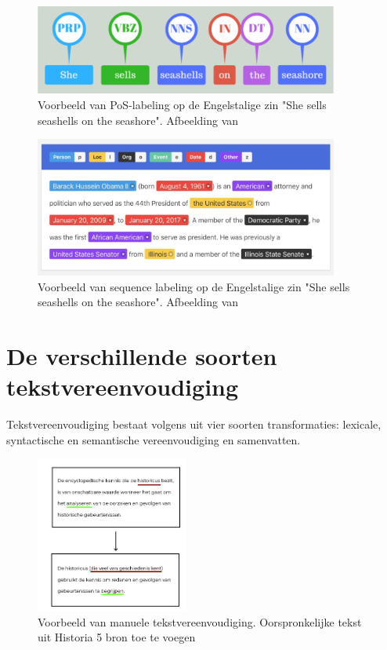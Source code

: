 \begin{figure}[H]
	\begin{center}
		\includegraphics[width=10cm]{img/poslabeling.png}
	\end{center}
	\caption{Voorbeeld van PoS-labeling op de Engelstalige zin "She sells seashells on the seashore". Afbeelding van \textcite{Bilisci2021} }
	\label{fig:pos}
\end{figure}

\begin{figure}[H]
	\begin{center}
		\includegraphics[width=10cm]{img/nerlabeling.jpg}
	\end{center}
	\caption{Voorbeeld van sequence labeling op de Engelstalige zin "She sells seashells on the seashore". Afbeelding van \textcite{Bilisci2021} }
	\label{fig:ner}
\end{figure}

\section{De verschillende soorten tekstvereenvoudiging}

Tekstvereenvoudiging bestaat volgens \textcite{Siddharthan2014} uit vier soorten transformaties: lexicale, syntactische en semantische vereenvoudiging en samenvatten.

\begin{figure}[H]
	\begin{center}
			\includegraphics[width=5cm]{img/voorbeeld-manuele-vereenvoudiging.png}
	\end{center}
	\caption{Voorbeeld van manuele tekstvereenvoudiging. Oorspronkelijke tekst uit Historia 5 bron toe te voegen}
\end{figure}

